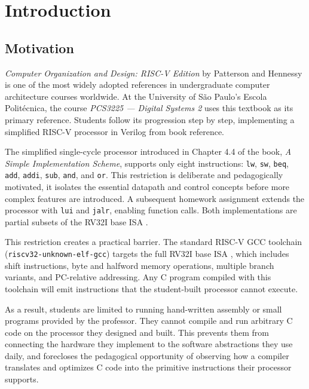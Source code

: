 \chapter{Introduction} \label{cap:intro}

\section{Motivation}

\textit{Computer Organization and Design: RISC-V Edition} by Patterson and Hennessy \cite{patterson2020}
is one of the most widely adopted references in undergraduate computer architecture courses worldwide.
At the University of São Paulo's Escola Politécnica, the course \textit{PCS3225 --- Digital Systems 2}
uses this textbook as its primary reference. Students follow its progression step by step, implementing
a simplified RISC-V processor in Verilog from book reference.

The simplified single-cycle processor introduced in Chapter 4.4 of the book, \textit{A Simple
Implementation Scheme}, supports only eight instructions: \texttt{lw}, \texttt{sw}, \texttt{beq},
\texttt{add}, \texttt{addi}, \texttt{sub}, \texttt{and}, and \texttt{or}. This restriction is
deliberate and pedagogically motivated, it isolates the essential datapath and control concepts before
more complex features are introduced. A subsequent homework assignment extends the processor with
\texttt{lui} and \texttt{jalr}, enabling function calls. Both implementations are partial subsets of
the RV32I base ISA \cite{riscv-spec}.

This restriction creates a practical barrier. The standard RISC-V GCC toolchain
(\texttt{riscv32-unknown-elf-gcc}) targets the full RV32I base ISA \cite{riscv-spec}, which includes
shift instructions, byte and halfword memory operations, multiple branch variants, and PC-relative
addressing. Any C program compiled with this toolchain will emit instructions that the student-built
processor cannot execute.

As a result, students are limited to running hand-written assembly or small programs provided by the
professor. They cannot compile and run arbitrary C code on the processor they designed and built. This
prevents them from connecting the hardware they implement to the software abstractions they use daily,
and forecloses the pedagogical opportunity of observing how a compiler translates and optimizes C code
into the primitive instructions their processor supports.


